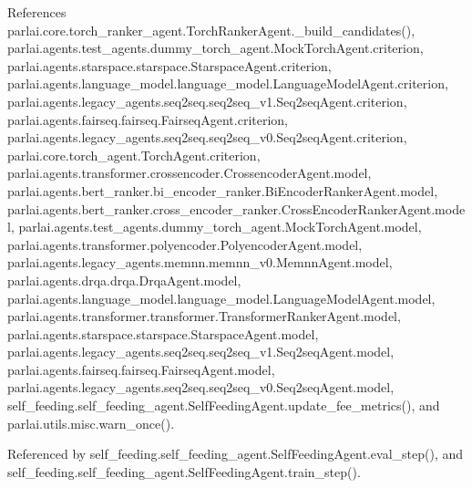 References parlai.\+core.\+torch\+\_\+ranker\+\_\+agent.\+Torch\+Ranker\+Agent.\+\_\+build\+\_\+candidates(), parlai.\+agents.\+test\+\_\+agents.\+dummy\+\_\+torch\+\_\+agent.\+Mock\+Torch\+Agent.\+criterion, parlai.\+agents.\+starspace.\+starspace.\+Starspace\+Agent.\+criterion, parlai.\+agents.\+language\+\_\+model.\+language\+\_\+model.\+Language\+Model\+Agent.\+criterion, parlai.\+agents.\+legacy\+\_\+agents.\+seq2seq.\+seq2seq\+\_\+v1.\+Seq2seq\+Agent.\+criterion, parlai.\+agents.\+fairseq.\+fairseq.\+Fairseq\+Agent.\+criterion, parlai.\+agents.\+legacy\+\_\+agents.\+seq2seq.\+seq2seq\+\_\+v0.\+Seq2seq\+Agent.\+criterion, parlai.\+core.\+torch\+\_\+agent.\+Torch\+Agent.\+criterion, parlai.\+agents.\+transformer.\+crossencoder.\+Crossencoder\+Agent.\+model, parlai.\+agents.\+bert\+\_\+ranker.\+bi\+\_\+encoder\+\_\+ranker.\+Bi\+Encoder\+Ranker\+Agent.\+model, parlai.\+agents.\+bert\+\_\+ranker.\+cross\+\_\+encoder\+\_\+ranker.\+Cross\+Encoder\+Ranker\+Agent.\+model, parlai.\+agents.\+test\+\_\+agents.\+dummy\+\_\+torch\+\_\+agent.\+Mock\+Torch\+Agent.\+model, parlai.\+agents.\+transformer.\+polyencoder.\+Polyencoder\+Agent.\+model, parlai.\+agents.\+legacy\+\_\+agents.\+memnn.\+memnn\+\_\+v0.\+Memnn\+Agent.\+model, parlai.\+agents.\+drqa.\+drqa.\+Drqa\+Agent.\+model, parlai.\+agents.\+language\+\_\+model.\+language\+\_\+model.\+Language\+Model\+Agent.\+model, parlai.\+agents.\+transformer.\+transformer.\+Transformer\+Ranker\+Agent.\+model, parlai.\+agents.\+starspace.\+starspace.\+Starspace\+Agent.\+model, parlai.\+agents.\+legacy\+\_\+agents.\+seq2seq.\+seq2seq\+\_\+v1.\+Seq2seq\+Agent.\+model, parlai.\+agents.\+fairseq.\+fairseq.\+Fairseq\+Agent.\+model, parlai.\+agents.\+legacy\+\_\+agents.\+seq2seq.\+seq2seq\+\_\+v0.\+Seq2seq\+Agent.\+model, self\+\_\+feeding.\+self\+\_\+feeding\+\_\+agent.\+Self\+Feeding\+Agent.\+update\+\_\+fee\+\_\+metrics(), and parlai.\+utils.\+misc.\+warn\+\_\+once().



Referenced by self\+\_\+feeding.\+self\+\_\+feeding\+\_\+agent.\+Self\+Feeding\+Agent.\+eval\+\_\+step(), and self\+\_\+feeding.\+self\+\_\+feeding\+\_\+agent.\+Self\+Feeding\+Agent.\+train\+\_\+step().

